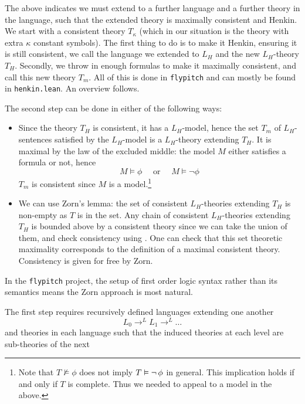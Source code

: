 The above indicates we must extend to a further language and a further theory
in the language, such that the extended theory is maximally consistent and Henkin.
We start with a consistent theory $T_{\kappa}$
(which in our situation is the theory with extra $\kappa$ constant symbols).
The first thing to do is to make it Henkin, ensuring it is still consistent,
we call the language we extended to $L_{H}$ and the new $L_{H}$-theory $T_{H}$.
Secondly, we throw in enough formulas to make it maximally consistent,
and call this new theory $T_{m}$.
All of this is done in \texttt{flypitch} and can mostly be found in \texttt{henkin.lean}.
An overview follows.

The second step can be done in either of the following ways:
\begin{itemize}
  \item Since the theory $T_{H}$ is consistent, it has a $L_{H}$-model,
        hence the set $T_{m}$ of $L_{H}$-sentences satisfied by the $L_{H}$-model is a
        $L_{H}$-theory extending $T_{H}$.
        It is maximal by the law of the excluded middle:
        the model $M$ either satisfies a formula or not,
        hence
        \[ M \vDash \phi \quad \text{ or } \quad M \vDash \neg \phi \]
        $T_{m}$ is consistent since $M$ is a model.\footnote{Note that
          $T \nvDash \phi$ does not imply $T \vDash \neg\, \phi$ in general.
          This implication holds if and only if $T$ is complete.
          Thus we needed to appeal to a model in the above.}
  \item We can use Zorn's lemma: the set of consistent $L_{H}$-theories extending
        $T_{H}$ is non-empty as $T$ is in the set.
        Any chain of consistent $L_{H}$-theories extending $T_{H}$ is bounded
        above by a consistent theory since we can take the union of them,
        and check consistency using .
        One can check that this set theoretic maximality corresponds to
        the definition of a maximal consistent theory.
        Consistency is given for free by Zorn.
\end{itemize}
In the \texttt{flypitch} project, the setup of first order logic
syntax rather than its semantics means the Zorn approach is most natural.

The first step requires recursively defined languages extending one another
\[ L_{0} \to^{L} L_{1} \to^{L} \dots \]
and theories in each language such that the induced theories
at each level are sub-theories of the next

